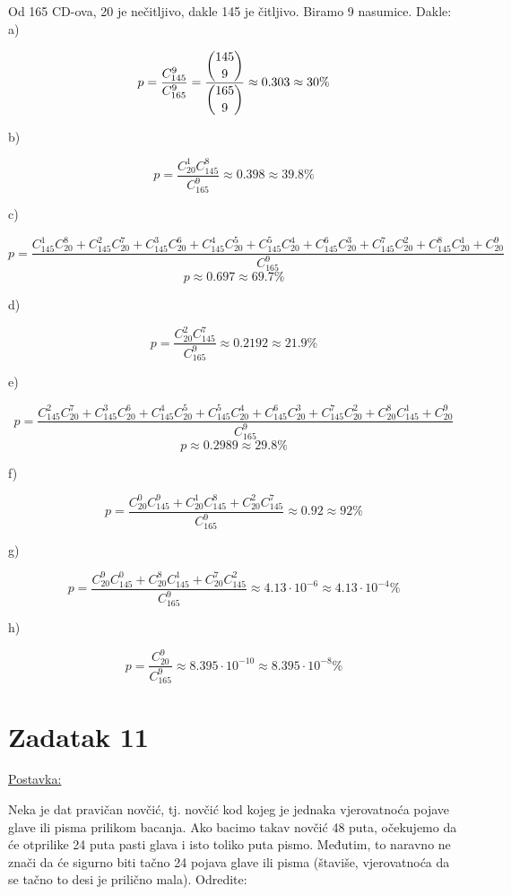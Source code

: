 \documentclass[12pt]{article}
\begin{document}
Od 165 CD-ova, 20 je nečitljivo, dakle 145 je čitljivo. Biramo 9 nasumice. Dakle:\\

a) 

$$p = \frac{C_{145}^9}{C_{165}^9} = \frac{\dbinom{145}{9}}{\dbinom{165}{9}} \approx 0.303 \approx 30\% $$

b)

$$p = \frac{C_{20}^1 C_{145}^8}{C_{165}^{9}} \approx 0.398 \approx 39.8\%$$

c)

$$p = \frac{ C_{145}^1 C_{20}^8 + C_{145}^2 C_{20}^7 + C_{145}^3 C_{20}^6 + C_{145}^4 C_{20}^5 + C_{145}^5 C_{20}^4 + C_{145}^6 C_{20}^3 + C_{145}^7 C_{20}^2 + C_{145}^8 C_{20}^1 + C_{20}^9}{C_{165}^{9}}$$
$$p \approx 0.697 \approx 69.7 \%$$

d)

$$p = \frac{C_{20}^2 C_{145}^7}{C_{165}^9} \approx 0.2192 \approx 21.9 \%$$

e)

$$p = \frac{ C_{145}^2 C_{20}^7 + C_{145}^3 C_{20}^6 + C_{145}^4 C_{20}^5 + C_{145}^5 C_{20}^4 + C_{145}^6 C_{20}^3 + C_{145}^7 C_{20}^2 + C_{20}^{8} C_{145}^{1} + C_{20}^9}{C_{165}^{9}}$$
$$p \approx 0.2989 \approx 29.8 \%$$

f)

$$p = \frac{C_{20}^0 C_{145}^9 + C_{20}^{1} C_{145}^{8} + C_{20}^{2} C_{145}^7}{C_{165}^{9}} \approx 0.92 \approx 92\%$$

g)

$$p = \frac{C_{20}^9 C_{145}^0 + C_{20}^{8} C_{145}^{1} + C_{20}^{7} C_{145}^2}{C_{165}^{9}} \approx 4.13 \cdot 10^{-6} \approx 4.13 \cdot 10^{-4}\%$$

h)

$$p = \frac{C_{20}^9}{C_{165}^9} \approx 8.395 \cdot 10^{-10} \approx 8.395 \cdot 10^{-8} \%$$

\newpage
\section*{Zadatak 11\label{Z11}}	 

\underline{Postavka:}

Neka je dat pravičan novčić, tj. novčić kod kojeg je jednaka vjerovatnoća pojave glave ili pisma prilikom bacanja. Ako bacimo takav novčić 48 puta, očekujemo da će otprilike 24 puta pasti glava i isto toliko puta pismo. Međutim, to naravno ne znači da će sigurno biti tačno 24 pojava glave ili pisma (štaviše, vjerovatnoća da se tačno to desi je prilično mala). Odredite:
\end{document}
